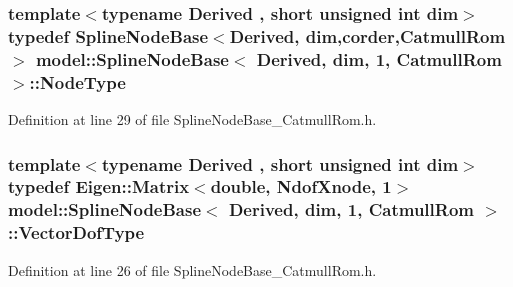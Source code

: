 \subsubsection[{Node\+Type}]{\setlength{\rightskip}{0pt plus 5cm}template$<$typename Derived , short unsigned int dim$>$ typedef {\bf Spline\+Node\+Base}$<$Derived, {\bf dim},{\bf corder},{\bf Catmull\+Rom}$>$ {\bf model\+::\+Spline\+Node\+Base}$<$ Derived, {\bf dim}, 1, {\bf Catmull\+Rom} $>$\+::{\bf Node\+Type}}\label{classmodel_1_1_spline_node_base_3_01_derived_00_01dim_00_011_00_01_catmull_rom_01_4_a62122ec7698f5b118c3d268097401fee}


Definition at line 29 of file Spline\+Node\+Base\+\_\+\+Catmull\+Rom.\+h.

\hypertarget{classmodel_1_1_spline_node_base_3_01_derived_00_01dim_00_011_00_01_catmull_rom_01_4_a357827d66168927f72b4b2a0bc1dc9e5}{}
\subsubsection[{Vector\+Dof\+Type}]{\setlength{\rightskip}{0pt plus 5cm}template$<$typename Derived , short unsigned int dim$>$ typedef Eigen\+::\+Matrix$<$double, {\bf Ndof\+Xnode}, 1$>$ {\bf model\+::\+Spline\+Node\+Base}$<$ Derived, {\bf dim}, 1, {\bf Catmull\+Rom} $>$\+::{\bf Vector\+Dof\+Type}}\label{classmodel_1_1_spline_node_base_3_01_derived_00_01dim_00_011_00_01_catmull_rom_01_4_a357827d66168927f72b4b2a0bc1dc9e5}


Definition at line 26 of file Spline\+Node\+Base\+\_\+\+Catmull\+Rom.\+h.



